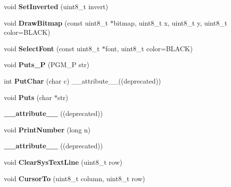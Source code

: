 \begin{DoxyCompactItemize}
\item 
\hypertarget{classglcd_a4c2f797be7a06cefbe38c818d5c81d14}{
void {\bfseries SetInverted} (uint8\_\-t invert)}
\label{classglcd_a4c2f797be7a06cefbe38c818d5c81d14}

\item 
\hypertarget{classglcd_ab908033b23619189d8cc2c54705f9893}{
void {\bfseries DrawBitmap} (const uint8\_\-t $\ast$bitmap, uint8\_\-t x, uint8\_\-t y, uint8\_\-t color=BLACK)}
\label{classglcd_ab908033b23619189d8cc2c54705f9893}

\item 
\hypertarget{classglcd_a774feb284411700450cc959ba95e019f}{
void {\bfseries SelectFont} (const uint8\_\-t $\ast$font, uint8\_\-t color=BLACK)}
\label{classglcd_a774feb284411700450cc959ba95e019f}

\item 
\hypertarget{classglcd_a0dac9c9863cc69b0b4ce722158f131a1}{
void {\bfseries Puts\_\-P} (PGM\_\-P str)}
\label{classglcd_a0dac9c9863cc69b0b4ce722158f131a1}

\item 
\hypertarget{classglcd_a3dbc964830f5004c4482a5f4045f90e8}{
int {\bfseries PutChar} (char c) \_\-\_\-attribute\_\-\_\-((deprecated))}
\label{classglcd_a3dbc964830f5004c4482a5f4045f90e8}

\item 
\hypertarget{classglcd_a19cb66c2aa302634345dedb6f9036243}{
void {\bfseries Puts} (char $\ast$str)}
\label{classglcd_a19cb66c2aa302634345dedb6f9036243}

\item 
\hypertarget{classglcd_a0343e2c770509d75cf19c38e0fec8d5f}{
{\bfseries \_\-\_\-attribute\_\-\_\-} ((deprecated))}
\label{classglcd_a0343e2c770509d75cf19c38e0fec8d5f}

\item 
\hypertarget{classglcd_a800dce3fee15490eb416d94688c2bca5}{
void {\bfseries PrintNumber} (long n)}
\label{classglcd_a800dce3fee15490eb416d94688c2bca5}

\item 
\hypertarget{classglcd_a0343e2c770509d75cf19c38e0fec8d5f}{
{\bfseries \_\-\_\-attribute\_\-\_\-} ((deprecated))}
\label{classglcd_a0343e2c770509d75cf19c38e0fec8d5f}

\item 
\hypertarget{classglcd_a26bc8c556e4c7bae32619b9f3cb733d8}{
void {\bfseries ClearSysTextLine} (uint8\_\-t row)}
\label{classglcd_a26bc8c556e4c7bae32619b9f3cb733d8}

\item 
\hypertarget{classglcd_a4aaa1849b81c34844cffa1cf01e37e39}{
void {\bfseries CursorTo} (uint8\_\-t column, uint8\_\-t row)}
\label{classglcd_a4aaa1849b81c34844cffa1cf01e37e39}


\end{DoxyCompactItemize}

